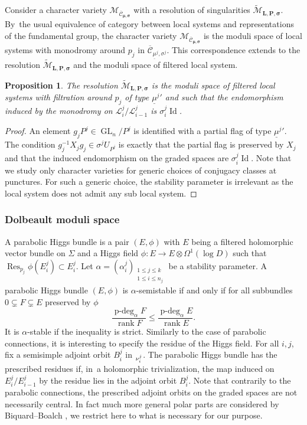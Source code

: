 \documentclass[11pt]{article}
\newcommand{\NoChangel}[1]{%
\expandafter\let\csname old\string#1\endcsname=#1
\let#1=\relax
\newcommand{#1}{\mathcode`l="716C\csname old\string#1\endcsname\mathcode`l="7160 }%
}
\theoremstyle{definition}
\theoremstyle{plain}
\newtheorem{proposition}[definition]{Proposition}
\DeclareMathOperator{\Id}{Id}
\DeclareMathOperator{\Res}{Res}
\DeclareMathOperator{\GL}{GL}
\DeclareMathOperator{\rank}{rank}
\DeclareMathOperator{\gl}{\mathfrak{gl}}\NoChangel{\gl}
\DeclareMathOperator{\pdeg}{p-deg}
\newcommand{\inv}{^{-1}}
\newcommand{\mcmus}{\mathcal{M}_{\overline{\mathcal{C}}_{\boldsymbol{\mu},\boldsymbol{\sigma}}}}
\newcommand{\mlps}{\widetilde{\mathcal{M}}_{\boldsymbol{L},\boldsymbol{P},\boldsymbol{\sigma}}}
\begin{document}
Consider a character variety $\mcmus$ with a resolution of singularities $\widetilde{\mathcal{M}}_{\boldsymbol{L},\boldsymbol{P}, \boldsymbol{\sigma}}$. By~the usual equivalence of category between local systems and representations of the fundamental group, the character variety $\mcmus$ is the moduli space of local systems with monodromy around $p_{j}$ in $\overline{\mathcal{C}}_{\underline{\mu}^j,\sigma^j}$. This correspondence extends to the resolution $\mlps$ and the moduli space of filtered local system.
\begin{proposition}\label{proposition_filtered_moduli_resolu}
The resolution $\mlps$ is the moduli space of filtered local systems with filtration around $p_j$ of type ${\underline{\mu}^j}'$ and such that the endomorphism induced by the monodromy on $\mathcal{L}^j_i/\mathcal{L}^j_{i-1}$ is $\sigma^j_i \Id$.
\end{proposition}
\begin{proof}
An element $g_j P^j \in \GL_n /P^j$ is identified with a partial flag of type ${\underline{\mu}^j}'$.
The condition $g_j\inv X_j g_j \in \sigma^j U_{P^j}$
is exactly that the partial flag is preserved by $X_j$
and that the induced endomorphism on the graded spaces are $\sigma_i^j \Id$.
Note that we study only character varieties for generic choices of conjugacy classes at punctures. For such a generic choice, the stability parameter is irrelevant as the local system does not admit any sub local system.
\end{proof}

\subsubsection{Dolbeault moduli space}\label{subsect_dol_alg}
A parabolic Higgs bundle is a pair $(E,\phi)$ with $E$ being a filtered holomorphic vector bundle on $\Sigma$ and a Higgs field $\phi : E \to E\otimes \Omega^1(\log D) $ such that $\Res_{p_j}\phi (E^j_i)\subset E^j_i$. Let $\alpha =(\alpha^j_i)_{\substack{1\le j \le k \\ 1 \le i \le n_j}}$ be a stability parameter. A parabolic Higgs bundle $(E,\phi)$ is $\alpha$-semistable if and only if for all subbundles $0\subsetneq F\subsetneq E$ preserved by $\phi$
\[
\frac{\pdeg_{\alpha} F}{\rank F} \le \frac{\pdeg_{\alpha} E}{\rank E}.
\]
It is $\alpha$-stable if the inequality is strict.
Similarly to the case of parabolic connections, it is interesting to specify the residue of the Higgs field. For all $i,j$, fix a semisimple adjoint orbit $B^j_i$ in $\gl_{\nu^j_i}$. The parabolic Higgs bundle has the prescribed residues if, in~a holomorphic trivialization, the map induced on $E^j_i / E^j_{i-1}$ by the residue lies in the adjoint orbit $B^j_i$. Note that contrarily to the parabolic connections, the prescribed adjoint orbits on the graded spaces are not necessarily central. In fact much more general polar parts are considered by Biquard--Boalch \cite{Biquard_Boalch_2004}, we restrict here to what is necessary for our purpose.
\end{document}
